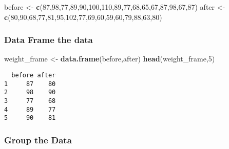 \documentclass[
]{article}
\newenvironment{Shaded}{\begin{snugshade}}{\end{snugshade}}
\newcommand{\DecValTok}[1]{\textcolor[rgb]{0.00,0.00,0.81}{#1}}
\newcommand{\FunctionTok}[1]{\textcolor[rgb]{0.13,0.29,0.53}{\textbf{#1}}}
\newcommand{\NormalTok}[1]{#1}
\newcommand{\OtherTok}[1]{\textcolor[rgb]{0.56,0.35,0.01}{#1}}
\begin{document}
\begin{Shaded}
\begin{Highlighting}[]
\NormalTok{before }\OtherTok{\textless{}{-}} \FunctionTok{c}\NormalTok{(}\DecValTok{87}\NormalTok{,}\DecValTok{98}\NormalTok{,}\DecValTok{77}\NormalTok{,}\DecValTok{89}\NormalTok{,}\DecValTok{90}\NormalTok{,}\DecValTok{100}\NormalTok{,}\DecValTok{110}\NormalTok{,}\DecValTok{89}\NormalTok{,}\DecValTok{77}\NormalTok{,}\DecValTok{68}\NormalTok{,}\DecValTok{65}\NormalTok{,}\DecValTok{67}\NormalTok{,}\DecValTok{87}\NormalTok{,}\DecValTok{98}\NormalTok{,}\DecValTok{67}\NormalTok{,}\DecValTok{87}\NormalTok{)}
\NormalTok{after }\OtherTok{\textless{}{-}} \FunctionTok{c}\NormalTok{(}\DecValTok{80}\NormalTok{,}\DecValTok{90}\NormalTok{,}\DecValTok{68}\NormalTok{,}\DecValTok{77}\NormalTok{,}\DecValTok{81}\NormalTok{,}\DecValTok{95}\NormalTok{,}\DecValTok{102}\NormalTok{,}\DecValTok{77}\NormalTok{,}\DecValTok{69}\NormalTok{,}\DecValTok{60}\NormalTok{,}\DecValTok{59}\NormalTok{,}\DecValTok{60}\NormalTok{,}\DecValTok{79}\NormalTok{,}\DecValTok{88}\NormalTok{,}\DecValTok{63}\NormalTok{,}\DecValTok{80}\NormalTok{)}
\end{Highlighting}
\end{Shaded}

\hypertarget{data-frame-the-data}{%
\subsubsection{Data Frame the data}\label{data-frame-the-data}}

\begin{Shaded}
\begin{Highlighting}[]
\NormalTok{weight\_frame }\OtherTok{\textless{}{-}} \FunctionTok{data.frame}\NormalTok{(before,after)}
\FunctionTok{head}\NormalTok{(weight\_frame,}\DecValTok{5}\NormalTok{)}
\end{Highlighting}
\end{Shaded}

\begin{verbatim}
  before after
1     87    80
2     98    90
3     77    68
4     89    77
5     90    81
\end{verbatim}

\hypertarget{group-the-data}{%
\subsubsection{Group the Data}\label{group-the-data}}
\end{document}
